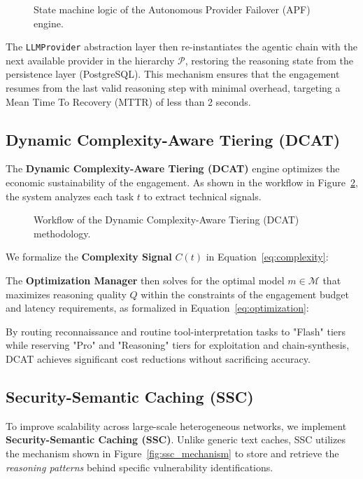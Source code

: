 \begin{figure}[!t]
    \centering
    \resizebox{\columnwidth}{!}{
        
    }
    \caption{State machine logic of the Autonomous Provider Failover (APF) engine.}
    \label{fig:apf_state}
\end{figure}

The \texttt{LLMProvider} abstraction layer then re-instantiates the agentic chain with the next available provider in the hierarchy $\mathcal{P}$, restoring the reasoning state from the persistence layer (PostgreSQL). This mechanism ensures that the engagement resumes from the last valid reasoning step with minimal overhead, targeting a Mean Time To Recovery (MTTR) of less than 2 seconds.

\subsection{Dynamic Complexity-Aware Tiering (DCAT)}
\label{sec:dcat}
The \textbf{Dynamic Complexity-Aware Tiering (DCAT)} engine optimizes the economic sustainability of the engagement. As shown in the workflow in Figure~\ref{fig:dcat_flow}, the system analyzes each task $t$ to extract technical signals.

\begin{figure}[!t]
    \centering
    \resizebox{\columnwidth}{!}{
        
    }
    \caption{Workflow of the Dynamic Complexity-Aware Tiering (DCAT) methodology.}
    \label{fig:dcat_flow}
\end{figure}

We formalize the \textbf{Complexity Signal} $C(t)$ in Equation~\ref{eq:complexity}:


The \textbf{Optimization Manager} then solves for the optimal model $m \in \mathcal{M}$ that maximizes reasoning quality $Q$ within the constraints of the engagement budget and latency requirements, as formalized in Equation~\ref{eq:optimization}:


By routing reconnaissance and routine tool-interpretation tasks to "Flash" tiers while reserving "Pro" and "Reasoning" tiers for exploitation and chain-synthesis, DCAT achieves significant cost reductions without sacrificing accuracy.

\subsection{Security-Semantic Caching (SSC)}
\label{sec:ssc}
To improve scalability across large-scale heterogeneous networks, we implement \textbf{Security-Semantic Caching (SSC)}. Unlike generic text caches, SSC utilizes the mechanism shown in Figure~\ref{fig:ssc_mechanism} to store and retrieve the \textit{reasoning patterns} behind specific vulnerability identifications.

